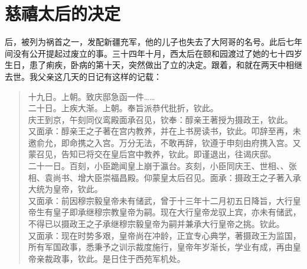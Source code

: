 \fancyhead[RO]{} %
\fancyhead[LE]{} %
\chapter*{慈禧太后的决定}
\thispagestyle{empty}
后，被列为祸首之一，发配新疆充军，他的儿子也失去了大阿哥的名号。此后七年间没有公开提起过废立的事。三十四年十月，西太后在颐和园渡过了她的七十四岁生日，患了痢疾，卧病的第十天，突然做出了立的决定。跟着，和就在两天中相继去世。我父亲这几天的日记有这样的记载：\\

\begin{quote}
	十九日。上朝。致庆邸急函一件……\\

二十日。上疾大渐。上朝。奉旨派恭代批折，钦此。\\

庆王到京，午刻同仪鸾殿面承召见，钦奉：醇亲王著授为摄政王，钦此。\\

又面承：醇亲王之子著在宫内教养，并在上书房读书，钦此。叩辞至再，未邀俞允，即命携之入宫。万分无法，不敢再辞，钦遵于申刻由府携入宫。又蒙召见，告知已将交在皇后宫中教养，钦此。即谨退出，往谒庆邸。\\

二十一日。百刻，小臣跪闻皇上崩于瀛台。亥刻，小臣同庆王、世相、、张相、袁尚书、增大臣崇福昌殿。仰蒙皇太后召见。面承：摄政王之子著入承大统为皇帝，钦此。\\

又面承：前因穆宗毅皇帝未有储武，曾于十三年十二月初五日降旨，大行皇帝生有皇子即承继穆宗教皇帝为嗣。现在大行皇帝龙驭上宾，亦未有储武，不得已以摄政王之子承继穆宗毅皇帝为嗣并兼承大行皇帝之挑。钦此。\\

又面承：现在时势多艰，皇帝尚在冲龄，正宜专心典学，著摄政王为监国，所有军国政事，悉秉予之训示裁度施行，皇帝年岁渐长，学业有成，再由皇帝亲裁政事，钦此。是日住于西苑军机处。\\
\end{quote}

